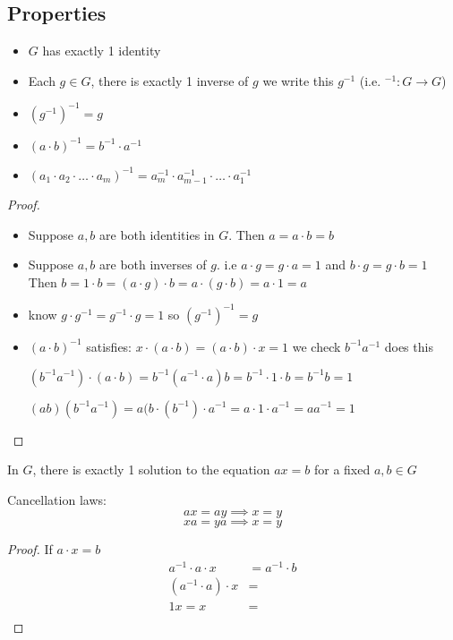 \subsection{Properties}
\begin{itemize}
  \item $G$ has exactly 1 identity
  \item Each $g \in G$, there is exactly 1 inverse of $g$ we write this $g^{-1}$
  (i.e. $^{-1}: G \rightarrow G$)
  \item $(g^{-1})^{-1} = g$
  \item $(a \cdot b)^{-1} = b^{-1} \cdot a^{-1}$
  \item $(a_1 \cdot a_2 \cdot \dotsc \cdot a_m)^{-1} = a_m^{-1} \cdot a_{m-1}^{-1} \cdot \dotsc \cdot a_1^{-1}$
\end{itemize}

\begin{proof}
  \text{}
  \begin{itemize}
    \item Suppose $a, b$ are both identities in $G$. Then $a = a \cdot b = b$
    \item Suppose $a, b$ are both inverses of $g$. i.e $a\cdot g = g\cdot a = 1$ and 
    $b\cdot g = g\cdot b = 1$ Then $b = 1\cdot b = (a\cdot g)\cdot b = a\cdot(g\cdot b) = a\cdot 1 = a$ 
    \item know $g\cdot g^{-1} = g^{-1}\cdot g = 1$ so $(g^{-1})^{-1} = g$
    \item $(a \cdot b)^{-1}$ satisfies: $x\cdot(a\cdot b) = (a\cdot b)\cdot x = 1$ 
    we check $b^{-1}a^{-1}$ does this 

    $(b^{-1}a^{-1})\cdot(a\cdot b) = b^{-1}(a^{-1}\cdot a)b = b^{-1} \cdot 1 \cdot b = b^{-1}b = 1$

    $(ab)(b^{-1}a^{-1}) = a(b\cdot(b^{-1})\cdot a^{-1} = a \cdot 1 \cdot a^{-1} = aa^{-1} = 1$
  \end{itemize}
\end{proof}

\begin{theorem}
  In $G$, there is exactly 1 solution to the equation $ax = b$ for a fixed $a, b \in G$
\end{theorem}

\begin{corollary}
  Cancellation laws:
  \[ax = ay \implies x = y\]
  \[xa = ya \implies x = y\]
\end{corollary}

\begin{proof}
  If $a\cdot x = b$
  \begin{align}
    a^{-1}\cdot a\cdot x &= a^{-1}\cdot b \\
    (a^{-1}\cdot a)\cdot x &=  \\
    1x = x &= \\
  \end{align}
\end{proof}

